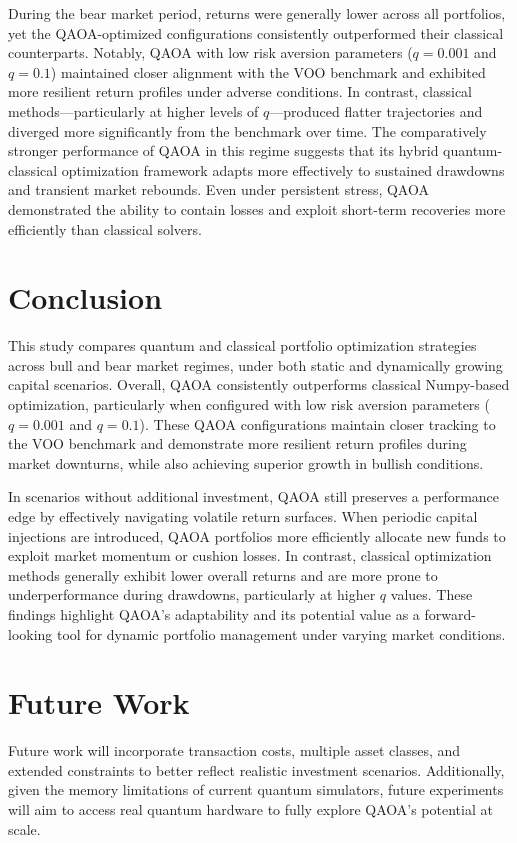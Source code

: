 \documentclass[12pt]{article}
\begin{document}
During the bear market period, returns were generally lower across all portfolios, yet the QAOA-optimized configurations consistently outperformed their classical counterparts. Notably, QAOA with low risk aversion parameters (\( q = 0.001 \) and \( q = 0.1 \)) maintained closer alignment with the VOO benchmark and exhibited more resilient return profiles under adverse conditions. In contrast, classical methods—particularly at higher levels of \( q \)—produced flatter trajectories and diverged more significantly from the benchmark over time. The comparatively stronger performance of QAOA in this regime suggests that its hybrid quantum-classical optimization framework adapts more effectively to sustained drawdowns and transient market rebounds. Even under persistent stress, QAOA demonstrated the ability to contain losses and exploit short-term recoveries more efficiently than classical solvers.


\section{Conclusion}

This study compares quantum and classical portfolio optimization strategies across bull and bear market regimes, under both static and dynamically growing capital scenarios. Overall, QAOA consistently outperforms classical Numpy-based optimization, particularly when configured with low risk aversion parameters (\( q = 0.001 \) and \( q = 0.1 \)). These QAOA configurations maintain closer tracking to the VOO benchmark and demonstrate more resilient return profiles during market downturns, while also achieving superior growth in bullish conditions. 

In scenarios without additional investment, QAOA still preserves a performance edge by effectively navigating volatile return surfaces. When periodic capital injections are introduced, QAOA portfolios more efficiently allocate new funds to exploit market momentum or cushion losses. In contrast, classical optimization methods generally exhibit lower overall returns and are more prone to underperformance during drawdowns, particularly at higher \( q \) values. These findings highlight QAOA's adaptability and its potential value as a forward-looking tool for dynamic portfolio management under varying market conditions.

\section{Future Work}

Future work will incorporate transaction costs, multiple asset classes, and extended constraints to better reflect realistic investment scenarios. Additionally, given the memory limitations of current quantum simulators, future experiments will aim to access real quantum hardware to fully explore QAOA’s potential at scale.

\printbibliography
\end{document}
